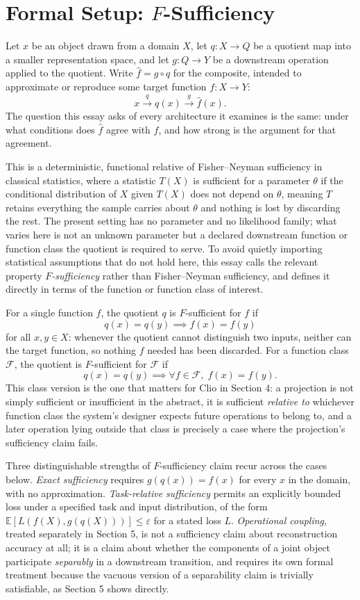 \documentclass[11pt]{article}
\begin{document}
\section{Formal Setup: $F$-Sufficiency}

Let $x$ be an object drawn from a domain $X$, let $q: X \to Q$ be a quotient map into a smaller representation space, and let $g: Q \to Y$ be a downstream operation applied to the quotient. Write $\widehat{f} = g \circ q$ for the composite, intended to approximate or reproduce some target function $f: X \to Y$:
\[
x \xrightarrow{\;q\;} q(x) \xrightarrow{\;g\;} \widehat{f}(x).
\]
The question this essay asks of every architecture it examines is the same: under what conditions does $\widehat{f}$ agree with $f$, and how strong is the argument for that agreement.

This is a deterministic, functional relative of Fisher--Neyman sufficiency in classical statistics, where a statistic $T(X)$ is sufficient for a parameter $\theta$ if the conditional distribution of $X$ given $T(X)$ does not depend on $\theta$, meaning $T$ retains everything the sample carries about $\theta$ and nothing is lost by discarding the rest. The present setting has no parameter and no likelihood family; what varies here is not an unknown parameter but a declared downstream function or function class the quotient is required to serve. To avoid quietly importing statistical assumptions that do not hold here, this essay calls the relevant property \emph{$F$-sufficiency} rather than Fisher--Neyman sufficiency, and defines it directly in terms of the function or function class of interest.

For a single function $f$, the quotient $q$ is $F$-sufficient for $f$ if
\[
q(x) = q(y) \implies f(x) = f(y)
\]
for all $x, y \in X$: whenever the quotient cannot distinguish two inputs, neither can the target function, so nothing $f$ needed has been discarded. For a function class $\mathcal{F}$, the quotient is $F$-sufficient for $\mathcal{F}$ if
\[
q(x) = q(y) \implies \forall f \in \mathcal{F},\; f(x) = f(y).
\]
This class version is the one that matters for Clio in Section 4: a projection is not simply sufficient or insufficient in the abstract, it is sufficient \emph{relative to} whichever function class the system's designer expects future operations to belong to, and a later operation lying outside that class is precisely a case where the projection's sufficiency claim fails.

Three distinguishable strengths of $F$-sufficiency claim recur across the cases below. \emph{Exact sufficiency} requires $g(q(x)) = f(x)$ for every $x$ in the domain, with no approximation. \emph{Task-relative sufficiency} permits an explicitly bounded loss under a specified task and input distribution, of the form $\mathbb{E}[L(f(X), g(q(X)))] \leq \varepsilon$ for a stated loss $L$. \emph{Operational coupling}, treated separately in Section 5, is not a sufficiency claim about reconstruction accuracy at all; it is a claim about whether the components of a joint object participate \emph{separably} in a downstream transition, and requires its own formal treatment because the vacuous version of a separability claim is trivially satisfiable, as Section 5 shows directly.
\end{document}
